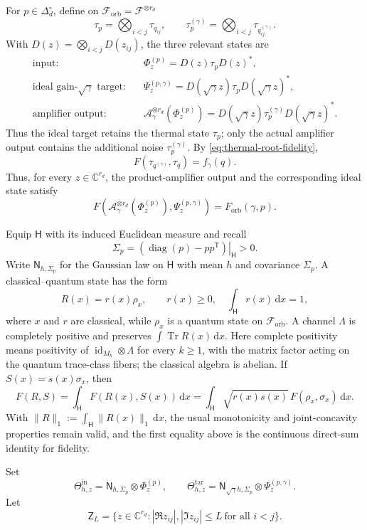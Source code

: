 \documentclass[11pt]{article}
\theoremstyle{remark}
\theoremstyle{plain}
\newcommand{\C}{\mathbb C}
\newcommand{\cA}{\mathcal A}
\newcommand{\cF}{\mathcal F}
\newcommand{\dd}{\mathrm d}
\newcommand{\diag}{\operatorname{diag}}
\newcommand{\Tr}{\operatorname{Tr}}
\newcommand{\ot}{\otimes}
\newcommand{\Forb}{F_{\mathrm{orb}}}
\begin{document}
For \(p\in\Delta_d^\circ\), define on
\(\cF_{\mathrm{orb}}=\cF^{\ot r_d}\)
\[
  \tau_p=\bigotimes_{i<j}\tau_{q_{ij}},
  \qquad
  \tau_p^{(\gamma)}
  =\bigotimes_{i<j}\tau_{q_{ij}^{(\gamma)}}.
\]
With \(D(z)=\bigotimes_{i<j}D(z_{ij})\), the three relevant
states are
\begin{align*}
  \text{input:}\quad
  &\Phi_z^{(p)}=D(z)\tau_pD(z)^*,\\
  \text{ideal gain-\(\sqrt\gamma\) target:}\quad
  &\Psi_z^{(p,\gamma)}=D(\sqrt\gamma z)\tau_pD(\sqrt\gamma z)^*,\\
  \text{amplifier output:}\quad
  &\cA_\gamma^{\ot r_d}(\Phi_z^{(p)})
    =D(\sqrt\gamma z)\tau_p^{(\gamma)}D(\sqrt\gamma z)^*.
\end{align*}
Thus the ideal target retains the thermal state \(\tau_p\); only the actual
amplifier output contains the additional noise \(\tau_p^{(\gamma)}\).  By
\eqref{eq:thermal-root-fidelity},
\begin{equation}\label{eq:one-mode-f}
  F(\tau_{q^{(\gamma)}},\tau_q)=f_\gamma(q).
\end{equation}
Thus, for every \(z\in\C^{r_d}\), the product-amplifier output and the
corresponding ideal state satisfy
\[
  F\!\left(\cA_\gamma^{\ot r_d}(\Phi_z^{(p)}),
           \Psi_z^{(p,\gamma)}\right)
  =\Forb(\gamma,p).
\]

Equip \(\mathsf H\) with its induced Euclidean measure and recall
\[
  \Sigma_p=\left.(\diag(p)-pp^{\mathsf T})\right|_{\mathsf H}>0.
\]
Write \(\mathsf N_{h,\Sigma_p}\) for the Gaussian law on \(\mathsf H\)
with mean \(h\) and covariance \(\Sigma_p\).  A
classical--quantum state has the form
\[
  R(x)=r(x)\rho_x,\qquad
  r(x)\ge0,\quad \int_{\mathsf H}r(x)\,\dd x=1,
\]
where \(x\) and \(r\) are classical, while \(\rho_x\) is a quantum state on
\(\cF_{\mathrm{orb}}\).  A channel \(\Lambda\) is completely positive and
preserves \(\int\Tr R(x)\,\dd x\).  Here complete positivity
means positivity of \(\operatorname{id}_{M_k}\otimes\Lambda\) for every
\(k\ge1\), with the matrix factor acting on the quantum trace-class fibers;
the classical algebra is abelian.  If
\(S(x)=s(x)\sigma_x\), then
\[
  F(R,S)=\int_{\mathsf H}F(R(x),S(x))\,\dd x
  =\int_{\mathsf H}\sqrt{r(x)s(x)}\,F(\rho_x,\sigma_x)\,\dd x.
\]
With \(\|R\|_1:=\int_{\mathsf H}\|R(x)\|_1\,\dd x\), the usual monotonicity
and joint-concavity properties remain valid, and the first equality above is
the continuous direct-sum identity for fidelity.

\par\indent
Set
\[
  \Theta_{h,z}^{\mathrm{in}}
  =\mathsf N_{h,\Sigma_p}\ot\Phi_z^{(p)},
  \qquad
  \Theta_{h,z}^{\mathrm{tar}}
  =\mathsf N_{\sqrt\gamma h,\Sigma_p}\ot\Psi_z^{(p,\gamma)}.
\]
Let
\[
  \mathsf Z_L
  =\{z\in\C^{r_d}:|\Re z_{ij}|,|\Im z_{ij}|\le L\ \text{for all }i<j\}.
\]
\end{document}
